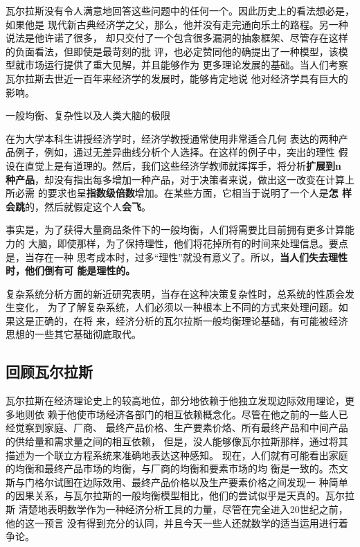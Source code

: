 瓦尔拉斯没有令人满意地回答这些问题中的任何一个。因此历史上的看法想必是，如果他是
现代新古典经济学之父，那么，他并没有走完通向乐土的路程。另一种说法是他许诺了很多，
却只交付了一个包含很多漏洞的抽象框架、尽管存在这样的负面看法，但即使是最苛刻的批
评，也必定赞同他的确提出了一种模型，该模型就市场运行提供了重大见解，并且能够作为
更多理论发展的基础。当人们考察瓦尔拉斯去世近一百年来经济学的发展时，能够肯定地说
他对经济学具有巨大的影响。

\begin{mybox}{一般均衡、复杂性以及人类大脑的极限}
  \begin{multicols}{2}在为大学本科生讲授经济学时，经济学教授通常使用非常适合几何
表达的两种产品例子，例如，通过无差异曲线分析个人选择。在这样的例子中，突出的理性
假设在直觉上是有道理的。然后，我们这些经济学教师就挥挥手，将分析\textbf{扩展到n
种产品}，却没有指出每多增加一种产品，对于决策者来说，做出这一改变在计算上所必需
的要求也呈\textbf{指数级倍数}增加。在某些方面，它相当于说明了一个人是\textbf{怎
样会跳}的，然后就假定这个人\textbf{会飞}。

    事实是，为了获得大量商品条件下的一般均衡，人们将需要比目前拥有更多计算能力的
大脑，即使那样，为了保持理性，他们将花掉所有的时间来处理信息。要点是，当存在一种
思考成本时，过多“理性”就没有意义了。所以，\textbf{当人们失去理性时，他们倒有可
能是理性的。}

  复杂系统分析方面的新近研究表明，当存在这种决策复杂性时，总系统的性质会发生变化，
为了了解复杂系统，人们必须以一种根本上不同的方式来处理问题。如果这是正确的，在将
来，经济分析的瓦尔拉斯一般均衡理论基础，有可能被经济思想的一些其它基础彻底取代。
  \end{multicols} %
\end{mybox}

\subsection{回顾瓦尔拉斯}

瓦尔拉斯在经济理论史上的较高地位，部分地依赖于他独立发现边际效用理论，更多地则依
赖于他使市场经济各部门的相互依赖概念化。尽管在他之前的一些人已经觉察到家庭、厂商、
最终产品价格、生产要素价烙、所有最终产品和中间产品的供给量和需求量之间的相互依赖，
但是，没人能够像瓦尔拉斯那样，通过将其描述为一个联立方程系统来准确地表达这种感知。
现在，人们就有可能看出家庭的均衡和最终产品市场的均衡，与厂商的均衡和要素市场的均
衡是一致的。杰文斯与门格尔试图在边际效用、最终产品价格以及生产要素价格之间发现一
种简单的因果关系，与瓦尔拉斯的一般均衡模型相比，他们的尝试似乎是天真的。瓦尔拉斯
清楚地表明数学作为一种经济分析工具的力量，尽管在完全进入20世纪之前，他的这一预言
没有得到充分的认同，并且今天一些人还就数学的适当运用进行着争论。


